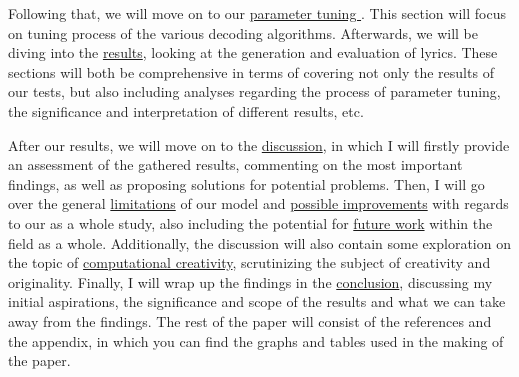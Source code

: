 Following that, we will move on to our \hyperref[chap:tuning-params]{parameter tuning }. This section will focus on tuning process of the various decoding algorithms. Afterwards, we will be diving into the \hyperref[sec:gen+eval]{results}, looking at the generation and evaluation of lyrics. These sections will both be comprehensive in terms of covering not only the results of our tests, but also including analyses regarding the process of parameter tuning, the significance and interpretation of different results, etc.

After our results, we will move on to the \hyperref[chap:discussion]{discussion}, in which I will firstly provide an assessment of the gathered results, commenting on the most important findings, as well as proposing solutions for potential problems. Then, I will go over the general \hyperref[sec:limitation+future-work]{limitations} of our model and \hyperref[sec:extending-evaluation]{possible improvements} with regards to our as a whole study, also including the potential for \hyperref[sec:transformers-etc]{future work} within the field as a whole. Additionally, the discussion will also contain some exploration on the topic of \hyperref[sec:creativity+language-patterns]{computational creativity}, scrutinizing the subject of creativity and originality. Finally, I will wrap up the findings in the \hyperref[chap:conclusion]{conclusion}, discussing my initial aspirations, the significance and scope of the results and what we can take away from the findings. The rest of the paper will consist of the references and the appendix, in which you can find the graphs and tables used in the making of the paper.

